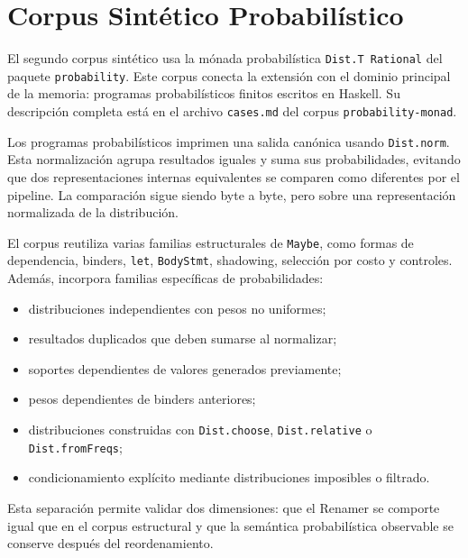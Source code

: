 
\section{Corpus Sintético Probabilístico}

El segundo corpus sintético usa la mónada probabilística \texttt{Dist.T Rational} del paquete \texttt{probability}. Este corpus conecta la extensión con el dominio principal de la memoria: programas probabilísticos finitos escritos en \textsf{Haskell}. Su descripción completa está en el archivo \texttt{cases.md} del corpus \texttt{probability-monad}.

Los programas probabilísticos imprimen una salida canónica usando \texttt{Dist.norm}. Esta normalización agrupa resultados iguales y suma sus probabilidades, evitando que dos representaciones internas equivalentes se comparen como diferentes por el pipeline. La comparación sigue siendo byte a byte, pero sobre una representación normalizada de la distribución.

El corpus reutiliza varias familias estructurales de \texttt{Maybe}, como formas de dependencia, binders, \texttt{let}, \texttt{BodyStmt}, shadowing, selección por costo y controles. Además, incorpora familias específicas de probabilidades:

\begin{itemize}
    \item distribuciones independientes con pesos no uniformes;
    \item resultados duplicados que deben sumarse al normalizar;
    \item soportes dependientes de valores generados previamente;
    \item pesos dependientes de binders anteriores;
    \item distribuciones construidas con \texttt{Dist.choose}, \texttt{Dist.relative} o \texttt{Dist.fromFreqs};
    \item condicionamiento explícito mediante distribuciones imposibles o filtrado.
\end{itemize}

Esta separación permite validar dos dimensiones: que el Renamer se comporte igual que en el corpus estructural y que la semántica probabilística observable se conserve después del reordenamiento.
